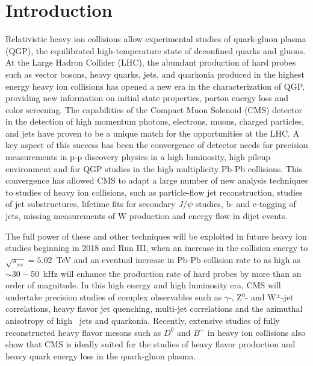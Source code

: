\section{Introduction}
\label{sec:intro}

Relativistic heavy ion collisions allow experimental studies of quark-gluon plasma (QGP), the equilibrated high-temperature state of deconfined quarks and gluons. At the Large Hadron Collider (LHC), the abundant production of hard probes such as vector bosons, heavy quarks, jets, and quarkonia produced in the highest energy heavy ion collisions has opened a new era in the characterization of QGP, providing new information on initial state properties, parton energy loss and color screening. The capabilities of the Compact Muon Solenoid (CMS) detector in the detection of high momentum photons, electrons, muons, charged particles, and jets have proven to be a unique match for the opportunities at the LHC. A key aspect of this success has been the convergence of detector needs for precision measurements in p-p discovery physics in a high luminosity, high pileup environment and for QGP studies in the high multiplicity Pb-Pb collisions. This convergence has allowed CMS to adapt a large number of new analysis techniques to studies of heavy ion collisions, such as particle-flow jet reconstruction, studies of jet substructures, lifetime fits for secondary $J/\psi$ studies,  b- and c-tagging of jets, missing \pt measurements of W production and energy flow in dijet events. 

The full power of these and other techniques will be exploited in future heavy ion studies beginning in 2018 and Run III, when an increase in the collision energy to $\sqrt{s_{_{NN}}} = 5.02$~TeV and an eventual increase in Pb-Pb collision rate to as high as $\sim 30-50$~kHz will enhance the production rate of hard probes by more than an order of magnitude. In this high energy and high luminosity era, CMS will undertake precision studies of complex observables such as $\gamma$-, Z$^0$- and W$^\pm$-jet correlations, heavy flavor jet quenching, multi-jet correlations and the azimuthal anisotropy of high \pt\ jets and quarkonia. Recently, extensive studies of fully reconstructed heavy flavor mesons such as $D^0$ and $B^+$ in heavy ion collisions also show that CMS is ideally suited for the studies of heavy flavor production and heavy quark energy loss in the quark-gluon plasma.

